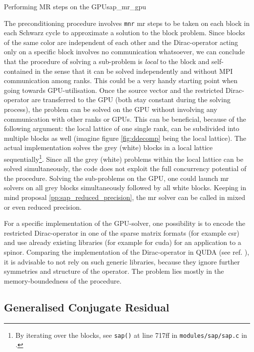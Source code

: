 \documentclass{article}
\theoremstyle{plain} %
\theoremstyle{convention} %
\theoremstyle{remark} %
\def\code#1{\texttt{#1}}
\numberwithin{equation}{section}
\begin{document}
\begin{proposal}{Performing MR steps on the GPU}{sap_mr_gpu}

The preconditioning procedure involves \code{mnr} \acrshort{mr} steps to be taken on each block in each Schwarz cycle to approximate a solution to the block problem. Since blocks of the same color are independent of each other and the Dirac-operator acting only on a specific block involves no communication whatsoever, we can conclude that the procedure of solving a sub-problem is \textit{local} to the block and self-contained in the sense that it can be solved independently and without MPI communication among ranks. This could be a very handy starting point when going towards GPU-utilisation. Once the source vector and the restricted Dirac-operator are transferred to the GPU (both stay constant during the solving process), the problem can be solved on the GPU without involving any communication with other ranks or GPUs. This can be beneficial, because of the following argument: the local lattice of one single rank, can be subdivided into multiple blocks as well (imagine figure \ref{fig:ddecomp} being the local lattice). The actual implementation solves the grey (white) blocks in a local lattice sequentially\footnote{By iterating over the blocks, see \code{sap()} at line \num{717}ff in \code{modules/sap/sap.c} in \cite{openqxd}.}. Since all the grey (white) problems within the local lattice can be solved simultaneously, the code does not exploit the full concurrency potential of the procedure. Solving the sub-problems on the GPU, one could launch \acrshort{mr} solvers on all grey blocks simultaneously followed by all white blocks. Keeping in mind proposal \ref{pp:sap_reduced_precision}, the \acrshort{mr} solver can be called in mixed or even reduced precision.

For a specific implementation of the GPU-solver, one possibility is to encode the restricted Dirac-operator in one of the sparse matrix formats (for example \acrshort{csr}) and use already existing libraries (for example \cite{bell2008} for \acrshort{cuda}) for an application to a spinor. Comparing the implementation of the Dirac-operator in QUDA (see ref. \cite{clark2010}), it is advisable to not rely on such generic libraries, because they ignore further symmetries and structure of the operator. The problem lies mostly in the memory-boundedness of the procedure.

\end{proposal}

\subsection{Generalised Conjugate Residual}
\end{document}

